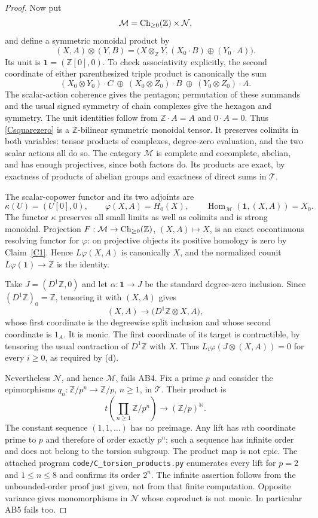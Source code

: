 \begin{proof}
Now put
\[
 \mathcal M=\operatorname{Ch}_{\geq0}(\mathbb Z)\times\mathcal N,
\]
and define a symmetric monoidal product by
\[
 (X,A)\otimes(Y,B)
 =\bigl(X\otimes_{\mathbb Z}Y,
        (X_0\cdot B)\oplus(Y_0\cdot A)\bigr).
 \tag{C-square-zero}\label{Csquarezero}
\]
Its unit is $\mathbf1=(\mathbb Z[0],0)$. To check associativity explicitly, the second coordinate of either parenthesized triple product is canonically the sum
\[
 (X_0\otimes Y_0)\cdot C\ \oplus\
 (X_0\otimes Z_0)\cdot B\ \oplus\
 (Y_0\otimes Z_0)\cdot A.
\]
The scalar-action coherence gives the pentagon; permutation of these summands and the usual signed symmetry of chain complexes give the hexagon and symmetry. The unit identities follow from $\mathbb Z\cdot A=A$ and $0\cdot A=0$. Thus \eqref{Csquarezero} is a $\mathbb Z$-bilinear symmetric monoidal tensor. It preserves colimits in both variables: tensor products of complexes, degree-zero evaluation, and the two scalar actions all do so. The category $\mathcal M$ is complete and cocomplete, abelian, and has enough projectives, since both factors do. Its products are exact, by exactness of products of abelian groups and exactness of direct sums in $\mathcal T$.

The scalar-copower functor and its two adjoints are
\[
 \kappa(U)=(U[0],0),\qquad
 \varphi(X,A)=H_0(X),\qquad
 \operatorname{Hom}_{\mathcal M}(\mathbf1,(X,A))=X_0.
\]
The functor $\kappa$ preserves all small limits as well as colimits and is strong monoidal. Projection $F:\mathcal M\to\operatorname{Ch}_{\geq0}(\mathbb Z)$, $(X,A)\mapsto X$, is an exact cocontinuous resolving functor for $\varphi$: on projective objects its positive homology is zero by Claim~\ref{C1}. Hence $L\varphi(X,A)$ is canonically $X$, and the normalized counit $L\varphi(\mathbf1)\to\mathbb Z$ is the identity.

Take $J=(D^1\mathbb Z,0)$ and let $\alpha:\mathbf1\to J$ be the standard degree-zero inclusion. Since $(D^1\mathbb Z)_0=\mathbb Z$, tensoring it with $(X,A)$ gives
\[
 (X,A)\longrightarrow\bigl(D^1\mathbb Z\otimes X,A\bigr),
\]
whose first coordinate is the degreewise split inclusion and whose second coordinate is $1_A$. It is monic. The first coordinate of its target is contractible, by tensoring the usual contraction of $D^1\mathbb Z$ with $X$. Thus $L_i\varphi(J\otimes(X,A))=0$ for every $i\geq0$, as required by (d).

Nevertheless $\mathcal N$, and hence $\mathcal M$, fails AB4. Fix a prime $p$ and consider the epimorphisms $q_n:\mathbb Z/p^n\to\mathbb Z/p$, $n\geq1$, in $\mathcal T$. Their product is
\[
 t\!\left(\prod_{n\geq1}\mathbb Z/p^n\right)
 \longrightarrow (\mathbb Z/p)^{\mathbb N}.
\]
The constant sequence $(1,1,\ldots)$ has no preimage. Any lift has $n$th coordinate prime to $p$ and therefore of order exactly $p^n$; such a sequence has infinite order and does not belong to the torsion subgroup. The product map is not epic. The attached program \texttt{code/C\_torsion\_products.py} enumerates every lift for $p=2$ and $1\leq n\leq8$ and confirms its order $2^n$. The infinite assertion follows from the unbounded-order proof just given, not from that finite computation. Opposite variance gives monomorphisms in $\mathcal N$ whose coproduct is not monic. In particular AB5 fails too.


\end{proof}
